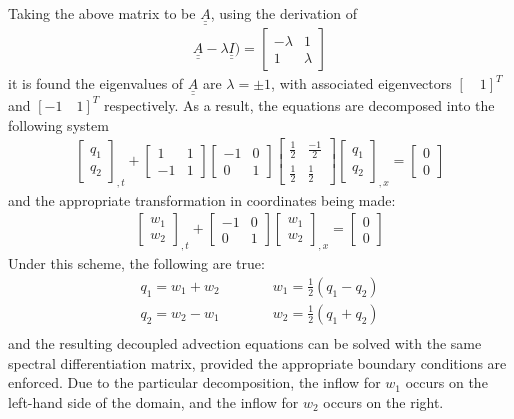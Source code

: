 \documentclass[12pt]{article}
\newcommand{\bunderline}[1]{\underline{#1}}
\newcommand{\mat}[1]{{\bunderline{\bunderline{#1}}}}
\begin{document}
Taking the above matrix to be $\mat{A}$, using the derivation of 
\begin{align*}
	\mat{A} - \lambda \mat{I}) = 
	\begin{bmatrix}
		-\lambda & 1 \\
		1 & \lambda
	\end{bmatrix}
\end{align*}
it is found the eigenvalues of $\mat{A}$ are $\lambda = \pm 1$, with associated eigenvectors $[\quad 1]^T$ and $[-1\quad1]^T$ respectively.
As a result, the equations are decomposed into the following system
\begin{align*}
	\begin{bmatrix}
		q_1\\
		q_2
	\end{bmatrix}_{,t} + 
	\begin{bmatrix}
		1 & 1 \\
		-1 & 1
	\end{bmatrix}	
	\begin{bmatrix}
		-1 & 0 \\
		0 & 1
	\end{bmatrix}
	\begin{bmatrix}
		\frac{1}{2} & \frac{-1}{2} \\
		\frac{1}{2} & \frac{1}{2}
	\end{bmatrix}
	\begin{bmatrix}
		q_1 \\
		q_2
	\end{bmatrix}_{,x} = 
	\begin{bmatrix}
		0 \\
		0
	\end{bmatrix}
\end{align*}
and the appropriate transformation in coordinates being made:
\begin{align*}
	\begin{bmatrix}
		w_1\\
		w_2
	\end{bmatrix}_{,t} + 
	\begin{bmatrix}
		-1 & 0 \\
		0 & 1
	\end{bmatrix}
	\begin{bmatrix}
		w_1 \\
		w_2
	\end{bmatrix}_{,x} = 
	\begin{bmatrix}
		0 \\
		0
	\end{bmatrix}
\end{align*}
Under this scheme, the following are true:
\begin{align*}
	q_1 = w_1 + w_2 \quad &\quad \quad w_1 = \frac{1}{2}(q_1 - q_2)\\
	q_2 = w_2 - w_1 \quad &\quad \quad w_2 = \frac{1}{2}(q_1 + q_2)\\
\end{align*}
and the resulting decoupled advection equations can be solved with the same spectral differentiation matrix, provided the appropriate boundary conditions are enforced.
Due to the particular decomposition, the inflow for $w_1$ occurs on the left-hand side of the domain, and the inflow for $w_2$ occurs on the right.
\end{document}
